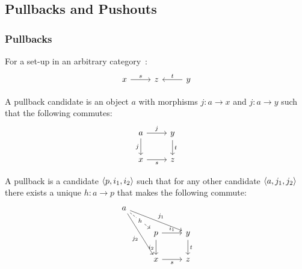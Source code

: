 \subsection{Pullbacks and Pushouts}

\subsubsection*{Pullbacks}

\begin{definition}
  For a set-up in an arbitrary
  category~\parencite[p.~114]{leinster:basic_category_theory}:
  \[\begin{tikzcd}[ampersand replacement=\&]
    x \& z \& y
    \arrow["t"', from=1-3, to=1-2]
    \arrow["s", from=1-1, to=1-2]
  \end{tikzcd}\]

  A pullback candidate is an object $a$ with morphisms $j:a\to x$ and
  $j:a\to y$ such that the following commutes:
  \[\begin{tikzcd}[ampersand replacement=\&]
    a \& y \\
    x \& z
    \arrow["t", from=1-2, to=2-2]
    \arrow["s"', from=2-1, to=2-2]
    \arrow["j"', from=1-1, to=2-1]
    \arrow["j", from=1-1, to=1-2]
  \end{tikzcd}\]

  A pullback is a candidate $\langle p, i_1, i_2\rangle$ such that for any other candidate
  $\langle a, j_1, j_2\rangle$ there exists a unique $h:a\to p$ that makes the following
  commute:
  \[\begin{tikzcd}[ampersand replacement=\&]
    a \\
    \& p \& y \\
    \& x \& z
    \arrow["{i_2}"', from=2-2, to=3-2]
    \arrow["{i_1}", from=2-2, to=2-3]
    \arrow["t", from=2-3, to=3-3]
    \arrow["s"', from=3-2, to=3-3]
    \arrow["{j_2}"', from=1-1, to=3-2]
    \arrow["{j_1}", from=1-1, to=2-3]
    \arrow["h"{description}, dashed, from=1-1, to=2-2]
  \end{tikzcd}\]
\end{definition}

